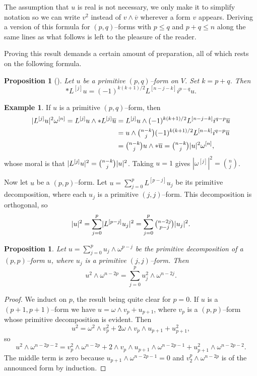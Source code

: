 \documentclass[11pt,a4paper]{amsart}
\def\^#1{^{[#1]}}
\newtheorem{prop}[theo]{Proposition}
\theoremstyle{definition}
\newtheorem{exam}[theo]{Example}
\numberwithin{equation}{section}
\begin{document}
The assumption that $u$ is real is not necessary, we only make it to
simplify notation so we can write $v^2$ instead of $v \wedge \overline v$
wherever a form $v$ appears. Deriving a version of this formula for
$(p,q)$--forms with $p \leq q$ and $p+q \leq n$ along the same lines as
what follows is left to the pleasure of the reader.

Proving this result demands a certain amount of preparation, all of which
rests on the following formula.


\begin{prop}[{{\cite[Proposition~1.67]{Huy}}}]
Let $u$ be a primitive $(p,q)$--form on $V$. Set $k = p+q$. Then
$$
    * L\^{j} u = (-1)^{k(k+1)/2} L\^{n-j-k} i^{p-q} u.
$$
\end{prop}


\begin{exam}
If $u$ is a primitive $(p,q)$--form, then
\begin{align*}
\lvert L\^{j} u \rvert^2 \omega\^{n}
= L\^{j} u \wedge * L\^{j} \overline{u}
&= L\^{j} u \wedge (-1)^{k(k+1)/2} L\^{n-j-k} i^{q-p} \overline{u} \\
&= u \wedge \tbinom{n-k}{j} (-1)^{k(k+1)/2} L\^{n-k} i^{q-p} \overline{u} \\
&= \tbinom{n-k}{j} u \wedge * \overline{u}
= \tbinom{n-k}{j} \lvert u \rvert^2 \omega\^{n},
\end{align*}
whose moral is that $\lvert L\^{j} u \rvert^2 = \tbinom{n-k}{j} \lvert u
\rvert^2$. Taking $u = 1$ gives $|\omega\^{j}|^2 = \binom{n}{j}$.
\end{exam}


Now let $u$ be a $(p,p)$--form. Let $u = \sum_{j=0}^p L\^{p-j} u_j$ be its primitive decomposition, where each $u_j$ is a primitive $(j,j)$--form. This decomposition is orthogonal, so
$$
\lvert u \rvert^2
= \sum_{j=0}^p \lvert L\^{p-j} u_j \rvert^2
= \sum_{j=0}^p \tbinom{n-2j}{p-j} \lvert u_j \rvert^2.
$$


\begin{prop}
  \label{16}
  Let $u = \sum_{j=0}^p u_j \wedge \omega^{p-j}$ be the primitive
decomposition of a $(p,p)$--form $u$, where $u_j$ is a primitive
$(j,j)$--form. Then
$$
u^2 \wedge \omega^{n-2p}
= \sum_{j=0}^p u_j^2 \wedge \omega^{n-2j}.
$$
\end{prop}

\begin{proof}
  We induct on $p$, the result being quite clear for $p = 0$. If $u$ is
  a $(p+1,p+1)$--form  we have $u = \omega \wedge v_p + u_{p+1}$, where
  $v_p$ is a $(p,p)$--form whose primitive decomposition is evident. Then
$$
u^2 = \omega^2 \wedge v_p^2 + 2 \omega \wedge v_p \wedge u_{p+1} +
u_{p+1}^2,
$$
so
$$
u^2 \wedge \omega^{n-2p-2}
= v_p^2 \wedge \omega^{n-2p}
+ 2 \wedge v_p \wedge u_{p+1} \wedge \omega^{n-2p-1}
+ u_{p+1}^2 \wedge \omega^{n-2p-2}.
$$
The middle term is zero because $u_{p+1} \wedge \omega^{n-2p-1} = 0$
and $v_2^p \wedge \omega^{n-2p}$ is of the announced form by induction.
\end{proof}
\end{document}

